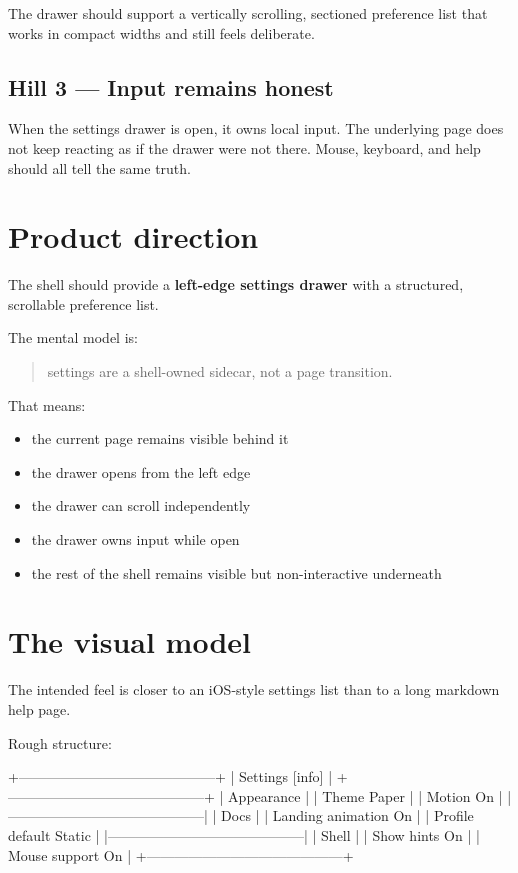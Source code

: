 The drawer should support a vertically scrolling, sectioned preference list that works in compact widths and still feels deliberate.

\subsection{Hill 3 --- Input remains honest}\label{record-057-hill-3-input-remains-honest}

When the settings drawer is open, it owns local input. The underlying page does not keep reacting as if the drawer were not there. Mouse, keyboard, and help should all tell the same truth.

\section{Product direction}\label{record-057-product-direction}

The shell should provide a \textbf{left-edge settings drawer} with a structured, scrollable preference list.

The mental model is:

\begin{quote}
settings are a shell-owned sidecar, not a page transition.
\end{quote}

That means:

\begin{itemize}
\tightlist
\item
  the current page remains visible behind it
\item
  the drawer opens from the left edge
\item
  the drawer can scroll independently
\item
  the drawer owns input while open
\item
  the rest of the shell remains visible but non-interactive underneath
\end{itemize}

\section{The visual model}\label{record-057-the-visual-model}

The intended feel is closer to an iOS-style settings list than to a long markdown help page.

Rough structure:

\begin{CodeBlock}
+------------------------------------------+
| Settings                            [info]   |
+------------------------------------------+
| Appearance                               |
|  Theme                            Paper  |
|  Motion                              On  |
|------------------------------------------|
| Docs                                     |
|  Landing animation                     On |
|  Profile default                  Static |
|------------------------------------------|
| Shell                                    |
|  Show hints                            On |
|  Mouse support                         On |
+------------------------------------------+
\end{CodeBlock}

